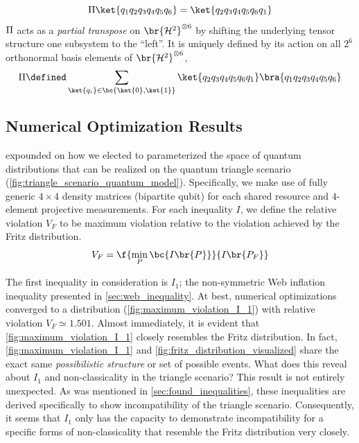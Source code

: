 \documentclass[aps, 10pt, english, twoside, pra, nofootinbib, tightenlines, longbibliography]{revtex4-1}
\begin{document}
    \[ \netperm\ket{q_1q_2q_3q_4q_5q_6} = \ket{q_2q_3q_4q_5q_6q_1} \]
    $\Pi$ acts as a \textit{partial transpose} on $\br{\Hilb^2}^{\otimes 6}$ by shifting the underlying tensor structure one subsystem to the ``left''. It is uniquely defined by its action on all $2^6$ orthonormal basis elements of $\br{\Hilb^2}^{\otimes 6}$,
    \[ \netperm \defined \sum_{\ket{q_i} \in \bc{\ket{0}, \ket{1}}}\ket{q_2q_3q_4q_5q_6q_1}\bra{q_1q_2q_3q_4q_5q_6} \]
    \subsection{Numerical Optimization Results}
    \label{sec:results}

     expounded on how we elected to parameterized the space of quantum distributions that can be realized on the quantum triangle scenario (\cref{fig:triangle_scenario_quantum_model}). Specifically, we make use of fully generic $4\times 4$ density matrices (bipartite qubit) for each shared resource and $4$-element projective measurements. For each inequality $I$, we define the relative violation $V_F$ to be maximum violation relative to the violation achieved by the Fritz distribution.
    \[ V_F = \f{\min_{P}\bc{I\br{P}}}{I\br{P_F}} \]

    The first inequality in consideration is $I_1$; the non-symmetric Web inflation inequality presented in \cref{sec:web_inequality}. At best, numerical optimizations converged to a distribution (\cref{fig:maximum_violation_I_1}) with relative violation $V_F \simeq 1.501$. Almost immediately, it is evident that \cref{fig:maximum_violation_I_1} closely resembles the Fritz distribution. In fact, \cref{fig:maximum_violation_I_1} and \cref{fig:fritz_distribution_visualized} share the exact same \textit{possibilistic structure} or set of possible events. What does this reveal about $I_1$ and non-classicality in the triangle scenario? This result is not entirely unexpected. As was mentioned in \cref{sec:found_inequalities}, these inequalities are derived specifically to show incompatibility of the triangle scenario. Consequently, it seems that $I_1$ only has the capacity to demonstrate incompatibility for a specific forms of non-classicality that resemble the Fritz distribution very closely.
\end{document}
